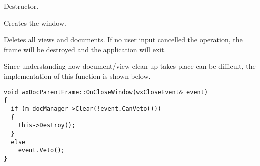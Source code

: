 
Destructor.

\label{wxdocmdiparentframecreate}


Creates the window.

\label{wxdocmdiparentframeonclosewindow}


Deletes all views and documents. If no user input cancelled the
operation, the frame will be destroyed and the application will exit.

Since understanding how document/view clean-up takes place can be difficult,
the implementation of this function is shown below.

\begin{verbatim}
void wxDocParentFrame::OnCloseWindow(wxCloseEvent& event)
{
  if (m_docManager->Clear(!event.CanVeto()))
  {
    this->Destroy();
  }
  else
    event.Veto();
}
\end{verbatim}

